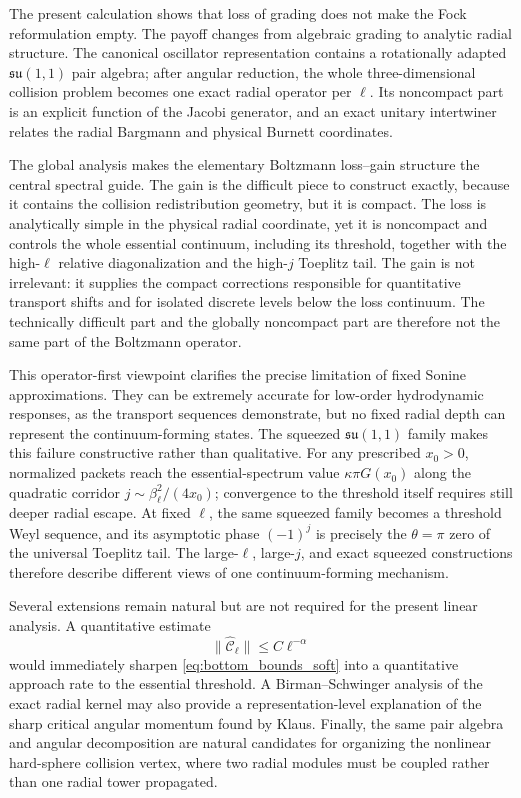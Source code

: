 \documentclass[11pt]{article}
\numberwithin{equation}{section}
\theoremstyle{definition}
\begin{document}
The present calculation shows that loss of grading does not make the Fock reformulation
empty.  The payoff changes from algebraic grading to analytic radial
structure.  The canonical oscillator representation contains a rotationally
adapted $\mathfrak{su}(1,1)$ pair algebra; after angular reduction, the whole
three-dimensional collision problem becomes one exact radial operator per
$\ell$.  Its noncompact part is an explicit function of the Jacobi generator,
and an exact unitary intertwiner relates the radial Bargmann and physical
Burnett coordinates.

The global analysis makes the elementary Boltzmann loss--gain structure the
central spectral guide.  The gain is the difficult piece to construct
exactly, because it contains the collision redistribution geometry, but it is
compact.  The loss is analytically simple in the physical radial coordinate,
yet it is noncompact and controls the whole essential continuum, including
its threshold, together with the high-$\ell$ relative diagonalization and the
high-$j$ Toeplitz tail.  The gain is not
irrelevant: it supplies the compact corrections responsible for quantitative
transport shifts and for isolated discrete levels below the loss continuum.
The technically difficult part and the globally noncompact part are therefore
not the same part of the Boltzmann operator.

This operator-first viewpoint clarifies the precise limitation of fixed Sonine
approximations.  They can be extremely accurate for low-order hydrodynamic
responses, as the transport sequences demonstrate, but no fixed radial depth
can represent the continuum-forming states.  The squeezed $\mathfrak{su}(1,1)$ family
makes this failure constructive rather than qualitative.  For any prescribed
$x_0>0$, normalized packets reach the essential-spectrum value
$\kappa\pi G(x_0)$ along the quadratic corridor
$j\sim\beta_\ell^2/(4x_0)$; convergence to the threshold itself requires still
deeper radial escape.  At fixed $\ell$, the same squeezed family becomes a
threshold Weyl sequence, and its asymptotic phase $(-1)^j$ is precisely the
$\theta=\pi$ zero of the universal Toeplitz tail.  The large-$\ell$, large-$j$,
and exact squeezed constructions therefore describe different views of one
continuum-forming mechanism.

Several extensions remain natural but are not required for the present
linear analysis.  A quantitative estimate
\begin{equation}
 \|\widehat{\mathcal C}_\ell\|\le C\ell^{-\alpha}
\end{equation}
would immediately sharpen \eqref{eq:bottom_bounds_soft} into a quantitative
approach rate to the essential threshold.  A Birman--Schwinger analysis of
the exact radial kernel may also provide a representation-level explanation
of the sharp critical angular momentum found by Klaus.  Finally, the same
pair algebra and angular decomposition are natural candidates for organizing
the nonlinear hard-sphere collision vertex, where two radial modules must be
coupled rather than one radial tower propagated.
\end{document}
